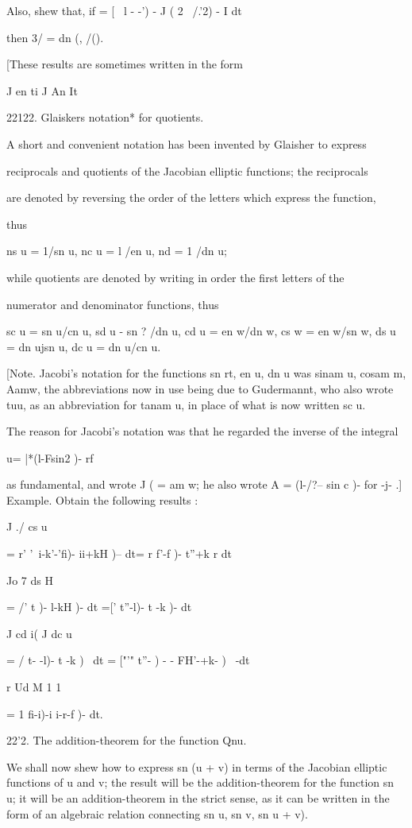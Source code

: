 Also, shew that, if = [ \ l - -') - J ( 2 \ /.'2) - I dt

then 3/ = dn (, /().

[These results are sometimes written in the form

J en ti J An It

22122. Glaiskers notation* for quotients.

A short and convenient notation has been invented by Glaisher to
express

reciprocals and quotients of the Jacobian elliptic functions; the
reciprocals

are denoted by reversing the order of the letters which express the
function,

thus

ns u = 1/sn u, nc u = l /en u, nd = 1 /dn u;

while quotients are denoted by writing in order the first letters of
the

numerator and denominator functions, thus

sc u = sn u/cn u, sd u - sn ? /dn u, cd u = en w/dn w, cs w = en w/sn
w, ds u = dn ujsn u, dc u = dn u/cn u.

[Note. Jacobi's notation for the functions sn rt, en u, dn u was sinam
u, cosam m, Aamw, the abbreviations now in use being due to
Gudermannt, who also wrote tuu, as an abbreviation for tanam u, in
place of what is now written sc u.

The reason for Jacobi's notation was that he regarded the inverse of
the integral

u= |*(l-Fsin2 )- rf

as fundamental, and wrote J ( = am w; he also wrote A = (l-/?-- sin c
)- for -j- .] Example. Obtain the following results :

J ./ cs u

= r' '\ i-k'-'fi)- ii+kH )-- dt= r f'-f )- t''+k r dt

Jo 7 ds H

= /' t )- l-kH )- dt =[' t''-l)- t -k )- dt

J cd i( J dc u

= / t- -l)- t -k )~ dt = ["'" t''- ) - - FH'-+k- )~ -dt

r Ud M 1 1

= 1 fi-i)-i i-r-f )- dt.

22'2. The addition-theorem for the function Qnu.

We shall now shew how to express sn (u + v) in terms of the Jacobian
elliptic functions of u and v; the result will be the
addition-theorem for the function sn u; it will be an
addition-theorem in the strict sense, as it can be written in the form
of an algebraic relation connecting sn u, sn v, sn u + v).

